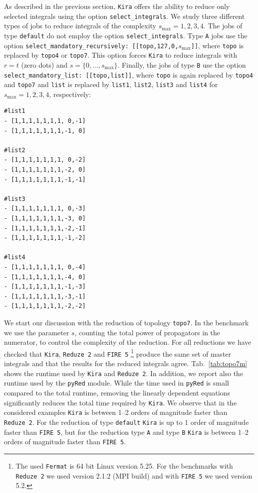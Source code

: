 \documentclass[a4paper,12pt]{scrartcl}
\newcommand*{\kira}{\texttt{Kira}}
\newcommand*{\pyred}{\texttt{pyRed}}
\newcommand*{\firefive}{\texttt{FIRE\,5}}
\newcommand*{\reduzetwo}{\texttt{Reduze\,2}}
\newcommand*{\fermat}{\texttt{Fermat}}
\def\Tab#1{{Tab.~\ref{#1}}}
\begin{document}
As described in the previous section, \kira{} offers the ability to reduce
only selected integrals using the option \texttt{select\_integrals}.
We study three different types of jobs to reduce integrals of the complexity
$s_{\max}=1,2,3,4$. The jobs of type \texttt{default} do not employ
the option \texttt{select\_integrals}. Type \texttt{A} jobs use the option
\texttt{select\_mandatory\_recursively: [[topo,127,0,$s_{\max}$]]}, where
\texttt{topo} is replaced by \texttt{topo4} or \texttt{topo7}. This option
forces \kira{} to reduce integrals with $r=t$ (zero dots) and
$s=\{0,\dots,s_{\max}\}$. Finally, the jobs of type \texttt{B} use the option
\texttt{select\_mandatory\_list: [[topo,list]]}, where \texttt{topo} is again
replaced by \texttt{topo4} and \texttt{topo7} and \texttt{list} is replaced by
\texttt{list1}, \texttt{list2}, \texttt{list3} and \texttt{list4} for
$s_{\max}=1,2,3,4$, respectively:
\begin{verbatim}
#list1
- [1,1,1,1,1,1,1, 0,-1]
- [1,1,1,1,1,1,1,-1, 0]

#list2
- [1,1,1,1,1,1,1, 0,-2]
- [1,1,1,1,1,1,1,-2, 0]
- [1,1,1,1,1,1,1,-1,-1]

#list3
- [1,1,1,1,1,1,1, 0,-3]
- [1,1,1,1,1,1,1,-3, 0]
- [1,1,1,1,1,1,1,-2,-1]
- [1,1,1,1,1,1,1,-1,-2]

#list4
- [1,1,1,1,1,1,1, 0,-4]
- [1,1,1,1,1,1,1,-4, 0]
- [1,1,1,1,1,1,1,-1,-3]
- [1,1,1,1,1,1,1,-3,-1]
- [1,1,1,1,1,1,1,-2,-2]
\end{verbatim}

We start our discussion with the reduction of topology \texttt{topo7}.
In the benchmark we use the parameter $s$, counting the total power of
propagators in the numerator, to control the complexity of the
reduction. For all reductions we have checked
that \kira{}, \reduzetwo{} and \firefive{}%
\footnote{
  The used \fermat{} is 64 bit Linux version 5.25.
  For the benchmarks with \reduzetwo{} we used version 2.1.2 (MPI build) and with \firefive{} we used version 5.2.
} 
produce the same set of master integrals and that
the results for the reduced integrals agree. \Tab{tab:topo7m}
shows the runtime used by \kira{} and \reduzetwo{}. In addition, we report also
the runtime used by the \pyred{} module. While the time used in \pyred{} is
small compared to the total runtime, removing the linearly dependent
equations significantly reduces the total time required by \kira{}.
We observe that in the considered examples \kira{} is between 1--2 orders of
magnitude faster than \reduzetwo{}. For the reduction of type \texttt{default} \kira{} is up to 1 order of magnitude faster than \firefive{}, but for the reduction type \texttt{A} and type \texttt{B} \kira{} is between 1--2 orders of magnitude faster than \firefive{}.
\end{document}
